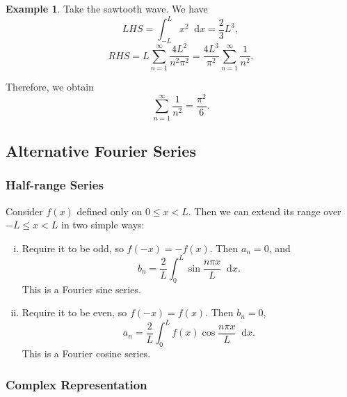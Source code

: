 \documentclass[12pt]{article}
\newcommand{\diff}{\mathop{}\!\mathrm{d}}
\theoremstyle{definition}
\newtheorem{example}{Example}[section]
\theoremstyle{remark}
\begin{document}
\begin{adjustbox}{minipage = \columnwidth - 25.5pt, margin=1em, frame=1pt, margin=0em}
\begin{example}
	Take the sawtooth wave. We have
	\[
	LHS = \int_{-L}^{L} x^2\diff x = \frac{2}{3}L^3
	,\]
	\[
	RHS = L \sum_{n = 1}^{\infty} \frac{4L^2}{n^2 \pi^2} = \frac{4L^3}{\pi ^2}\sum_{n = 1}^{\infty} \frac{1}{n^2}
	.\]

\end{example}

\end{adjustbox}

\begin{adjustbox}{minipage = \columnwidth - 25.5pt, margin=1em, frame=1pt, margin=0em}
Therefore, we obtain
\[
\sum_{n = 1}^{\infty} \frac{1}{n^2} = \frac{\pi^2}{6}
.\]
\end{adjustbox}

\subsection{Alternative Fourier Series}%
\label{sub:alternative_fourier_series}

\subsubsection{Half-range Series}%
\label{subsub:half_range_series}

Consider $f(x)$ defined only on $0 \leq x < L$. Then we can extend its range over $- L \leq x < L$ in two simple ways:
\begin{enumerate}[(i)]
	\item Require it to be odd, so $f(-x) = -f(x)$. Then $a_n = 0$, and
		\[
			b_n = \frac{2}{L} \int_{0}^{L} \sin \frac{n \pi x}{L}\diff x
		.\]
		This is a Fourier sine series.
	\item Require it to be even, so $f(-x) = f(x)$. Then $b_n = 0$,
		\[
			a_n = \frac{2}{L} \int_{0}^{L}f(x) \cos \frac{n \pi x}{L}\diff x
		.\]
		This is a Fourier cosine series.
\end{enumerate}

\subsubsection{Complex Representation}%
\label{subsub:complex_representation}
\end{document}
